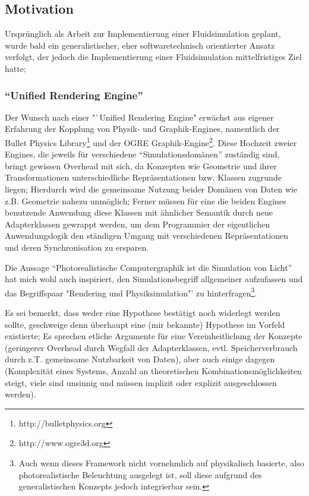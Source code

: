 \subsection{Motivation}

Ursprünglich als Arbeit zur Implementierung einer Fluidsimulation geplant, wurde bald ein generalistischer, eher softwaretechnisch orientierter Ansatz verfolgt, der jedoch die Implementierung einer Fluidsimulation mittelfristiges Ziel hatte;\\

\subsubsection{"`Unified Rendering Engine"'}
Der Wunsch nach einer "`Unified Rendering Engine" erwächst aus eigener Erfahrung der Kopplung von Physik- und Graphik-Engines, namentlich der Bullet Physics Library\footnote{http://bulletphysics.org} und der OGRE Graphik-Engine\footnote{http://www.ogre3d.org}. Diese Hochzeit zweier Engines, die jeweils für verschiedene "`Simulationsdomänen"' zuständig sind, bringt gewissen Overhead mit sich, da Konzepten wie  Geometrie und ihrer Transformationen unterschiedliche Repräsentationen bzw. Klassen zugrunde liegen;
Hierdurch wird die gemeinsame Nutzung beider Domänen von Daten wie z.B. Geometrie nahezu unmöglich; Ferner müssen für eine die beiden Engines benutzende Anwendung diese Klassen mit ähnlicher Semantik durch neue Adapterklassen gewrappt werden,
um dem Programmier der eigentlichen Anwendungslogik den ständigen Umgang mit verschiedenen Repräsentationen und deren Synchronisation zu ersparen.\\


Die Aussage "`Photorealistische Computergraphik ist die Simulation von Licht"'  hat mich wohl auch inspiriert, den Simulationsbegriff allgemeiner aufzufassen und das Begriffspaar "Rendering und Physiksimulation"' zu hinterfragen\footnote{Auch wenn dieses Framework nicht vornehmlich auf physikalisch basierte, also photorealistische Beleuchtung ausgelegt ist, soll diese aufgrund des generalistischen Konzepts jedoch integrierbar sein.}.

Es sei bemerkt, dass weder eine Hypothese bestätigt noch widerlegt werden sollte, geschweige denn überhaupt eine (mir bekannte) Hypothese im Vorfeld existierte; Es sprechen etliche Argumente für eine Vereinheitlichung der Konzepte (geringerer Overhead durch Wegfall der Adapterklassen, evtl. Speicherverbrauch durch z.T. gemeinsame Nutzbarkeit von Daten), aber auch einige dagegen (Komplexität eines Systems, Anzahl an theoretischen Kombinationsmöglichkeiten steigt, viele sind unsinnig und müssen implizit oder explizit ausgeschlossen werden).\\

